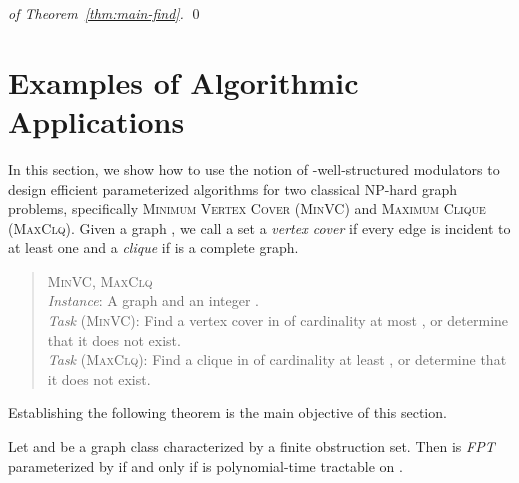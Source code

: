 \documentclass{llncs}
\def\wsm{well-structured modulator}
\begin{document}
\lv{\algo}

\begin{proof}[of Theorem~\ref{thm:main-find}]
\qed
\end{proof}





\section{Examples of Algorithmic Applications}
\label{sec:examples}

In this section, we show how to use the notion of -\wsm s to design efficient parameterized algorithms for two classical NP-hard graph problems, specifically \textsc{Minimum Vertex Cover (MinVC)} and \textsc{Maximum Clique (MaxClq)}. Given a graph , we call a set  a \emph{vertex cover} if every edge is incident to at least one  and a \emph{clique} if  is a complete graph.

\vspace{-.5cm}
\begin{center}
  \begin{boxedminipage}[t]{0.99\textwidth}
\begin{quote}
\smallskip
  \textsc{MinVC, MaxClq}\\ \nopagebreak
\emph{Instance}: A graph  and an integer .\\ \nopagebreak
  \emph{Task} (\textsc{MinVC}): Find a vertex cover in  of cardinality at most , or determine that it does not exist. \\
\emph{Task} (\textsc{MaxClq}): Find a clique in  of cardinality at least , or determine that it does not exist. \smallskip
\end{quote}
\end{boxedminipage}
\end{center}

Establishing the following theorem is the main objective of this section.

\begin{theorem}
\label{thm:problems}
Let  and  be a graph class characterized by a finite obstruction set. Then  is \emph{FPT} parameterized by  if and only if  is polynomial-time tractable on .
\end{theorem}
\end{document}
